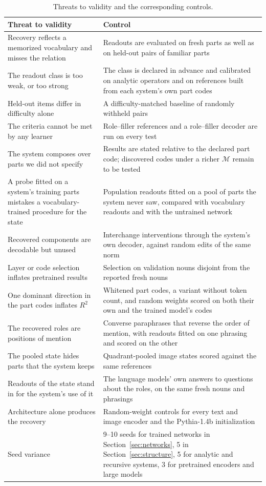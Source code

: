 \documentclass[10pt]{article}
\theoremstyle{plain}
\theoremstyle{remark}
\newcommand{\M}{\mathcal{M}}
\begin{document}
\begin{table}[t]
  \caption{Threats to validity and the corresponding controls.}
  \label{tab:controls}
  \centering\small
  \begin{tabularx}{\linewidth}{@{}YY@{}}
    \toprule
    Threat to validity & Control \\
    \midrule
    Recovery reflects a memorized vocabulary and misses the relation & Readouts are evaluated on fresh parts as well as on held-out pairs of familiar parts \\
    The readout class is too weak, or too strong & The class is declared in advance and calibrated on analytic operators and on references built from each system's own part codes \\
    Held-out items differ in difficulty alone & A difficulty-matched baseline of randomly withheld pairs \\
    The criteria cannot be met by any learner & Role--filler references and a role--filler decoder are run on every test \\
    The system composes over parts we did not specify & Results are stated relative to the declared part code; discovered codes under a richer $\M$ remain to be tested \\
    A probe fitted on a system's training parts mistakes a vocabulary-trained procedure for the state & Population readouts fitted on a pool of parts the system never saw, compared with vocabulary readouts and with the untrained network \\
    Recovered components are decodable but unused & Interchange interventions through the system's own decoder, against random edits of the same norm \\
    Layer or code selection inflates pretrained results & Selection on validation nouns disjoint from the reported fresh nouns \\
    One dominant direction in the part codes inflates $R^2$ & Whitened part codes, a variant without token count, and random weights scored on both their own and the trained model's codes \\
    The recovered roles are positions of mention & Converse paraphrases that reverse the order of mention, with readouts fitted on one phrasing and scored on the other \\
    The pooled state hides parts that the system keeps & Quadrant-pooled image states scored against the same references \\
    Readouts of the state stand in for the system's use of it & The language models' own answers to questions about the roles, on the same fresh nouns and phrasings \\
    Architecture alone produces the recovery & Random-weight controls for every text and image encoder and the Pythia-1.4b initialization \\
    Seed variance & 9--10 seeds for trained networks in Section~\ref{sec:networks}, 5 in Section~\ref{sec:structure}, 5 for analytic and recursive systems, 3 for pretrained encoders and large models \\
    \bottomrule
  \end{tabularx}
\end{table}
\end{document}
